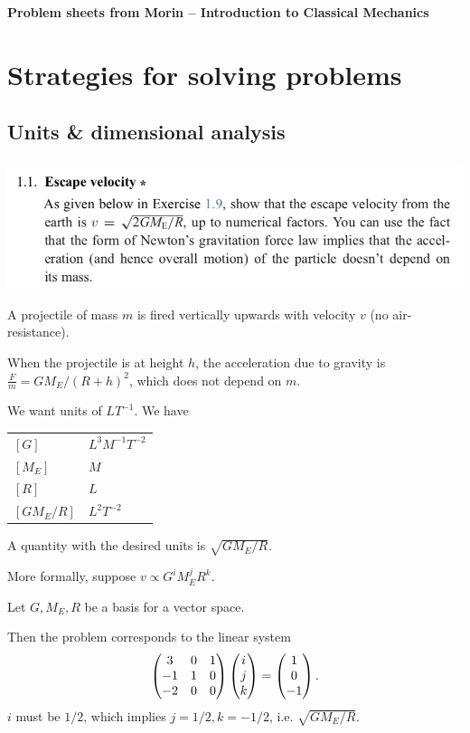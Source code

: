 {\bf Problem sheets from Morin -- Introduction to Classical Mechanics}

\section{Strategies for solving problems}
\subsection*{Units \& dimensional analysis}
\subsubsection*{}
\begin{mdframed}
  \includegraphics[width=400pt]{img/physics--classical-mechanics--morin--1-1.png}
\end{mdframed}

A projectile of mass $m$ is fired vertically upwards with velocity $v$ (no air-resistance).

When the projectile is at height $h$, the acceleration due to gravity is
$\frac{F}{m} = GM_E/(R + h)^2$, which does not depend on $m$.

We want units of $LT^{-1}$. We have

\begin{tabular*}{1.0\linewidth}{l|l}
  $[G]$        & $L^3M^{-1}T^{-2}$ \\
  $[M_E]$      & $M$ \\
  $[R]$        & $L$ \\
  $[GM_E / R]$ & $L^2T^{-2}$
\end{tabular*}

A quantity with the desired units is $\sqrt{GM_E/R}$.

More formally, suppose $v \propto G^iM_E^jR^k$.

Let  ${G, M_E, R}$ be a basis for a vector space.

Then the problem corresponds to the linear system
\begin{align*}
  \begin{pmatrix}3 & 0 & 1\\-1 & 1 & 0\\-2 & 0 & 0\\ \end{pmatrix} \begin{pmatrix}i\\j\\k\end{pmatrix} = \begin{pmatrix}1\\0\\-1\end{pmatrix}.
\end{align*}
$i$ must be $1/2$, which implies $j = 1/2, k = -1/2$, i.e. $\sqrt{GM_E/R}$. \checkmark

